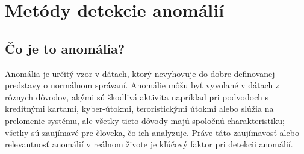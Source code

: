 \chapter{Metódy detekcie anomálií}
\section{Čo je to anomália?}
Anomália je určitý vzor v dátach, ktorý nevyhovuje do dobre definovanej predstavy o normálnom správaní. Anomálie môžu byť vyvolané v dátach z rôznych dôvodov, akými sú škodlivá aktivita napríklad pri podvodoch s kreditnými kartami, kyber-útokmi, teroristickými útokmi alebo slúžia na prelomenie systému, ale všetky tieto dôvody majú spoločnú charakteristiku; všetky sú zaujímavé pre človeka, čo ich analyzuje. Práve táto zaujímavosť alebo relevantnosť anomálií v reálnom živote je kľúčový faktor pri detekcii anomálií.\cite{Chandola}
